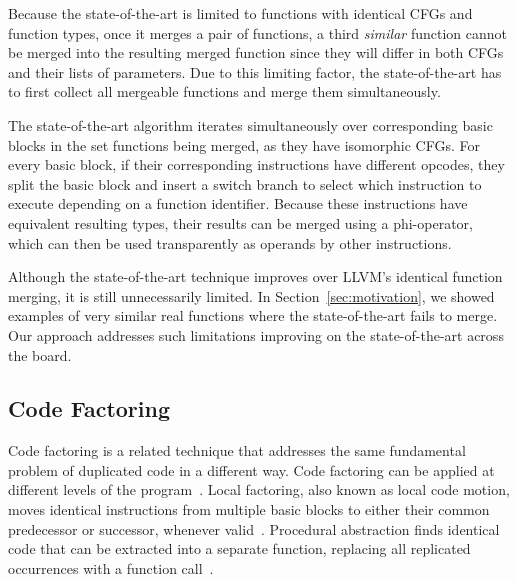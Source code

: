 
Because the state-of-the-art is limited to functions with identical CFGs
and function types, once it merges a pair of functions, a third
\textit{similar} function cannot be merged into the resulting merged function
since they will differ in both CFGs and their lists of parameters.
Due to this limiting factor, the state-of-the-art has to first collect all
mergeable functions and merge them simultaneously.

The state-of-the-art algorithm iterates simultaneously over corresponding basic
blocks in the set functions being merged, as they have isomorphic CFGs.
For every basic block, if their corresponding instructions have different opcodes,
they split the basic block and insert a switch branch to select which instruction
to execute depending on a function identifier.
Because these instructions have equivalent resulting types, their results can be
merged using a phi-operator, which can then be used transparently as operands
by other instructions.

Although the state-of-the-art technique improves over LLVM's identical function merging, it is
still unnecessarily limited. In Section~\ref{sec:motivation}, we showed examples of very similar
real functions where the state-of-the-art fails to merge. Our approach addresses such limitations
improving on the state-of-the-art across the board.

\subsection{Code Factoring}

Code factoring is a related technique that addresses the same fundamental
problem of duplicated code in a different way.
Code factoring can be applied at different levels of the program~\cite{loki04}.
Local factoring, also known as local code motion, moves identical instructions
from multiple basic blocks to either their common predecessor or successor,
whenever valid~\cite{knoop94,briggs94,loki04}.
Procedural abstraction %
finds identical code
that can be extracted into a separate function, replacing all replicated
occurrences with a function call~\cite{loki04,dreweke07}.

